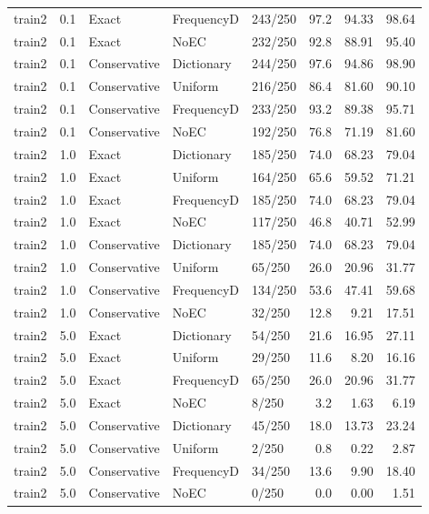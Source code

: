 \begin{longtable}{@{}lrlllrrr@{}}
train2 & 0.1 & Exact & FrequencyD & 243/250 & 97.2 & 94.33 & 98.64\\
train2 & 0.1 & Exact & NoEC & 232/250 & 92.8 & 88.91 & 95.40\\
train2 & 0.1 & Conservative & Dictionary & 244/250 & 97.6 & 94.86 & 98.90\\
train2 & 0.1 & Conservative & Uniform & 216/250 & 86.4 & 81.60 & 90.10\\
train2 & 0.1 & Conservative & FrequencyD & 233/250 & 93.2 & 89.38 & 95.71\\
train2 & 0.1 & Conservative & NoEC & 192/250 & 76.8 & 71.19 & 81.60\\
train2 & 1.0 & Exact & Dictionary & 185/250 & 74.0 & 68.23 & 79.04\\
train2 & 1.0 & Exact & Uniform & 164/250 & 65.6 & 59.52 & 71.21\\
train2 & 1.0 & Exact & FrequencyD & 185/250 & 74.0 & 68.23 & 79.04\\
train2 & 1.0 & Exact & NoEC & 117/250 & 46.8 & 40.71 & 52.99\\
train2 & 1.0 & Conservative & Dictionary & 185/250 & 74.0 & 68.23 & 79.04\\
train2 & 1.0 & Conservative & Uniform & 65/250 & 26.0 & 20.96 & 31.77\\
train2 & 1.0 & Conservative & FrequencyD & 134/250 & 53.6 & 47.41 & 59.68\\
train2 & 1.0 & Conservative & NoEC & 32/250 & 12.8 & 9.21 & 17.51\\
train2 & 5.0 & Exact & Dictionary & 54/250 & 21.6 & 16.95 & 27.11\\
train2 & 5.0 & Exact & Uniform & 29/250 & 11.6 & 8.20 & 16.16\\
train2 & 5.0 & Exact & FrequencyD & 65/250 & 26.0 & 20.96 & 31.77\\
train2 & 5.0 & Exact & NoEC & 8/250 & 3.2 & 1.63 & 6.19\\
train2 & 5.0 & Conservative & Dictionary & 45/250 & 18.0 & 13.73 & 23.24\\
train2 & 5.0 & Conservative & Uniform & 2/250 & 0.8 & 0.22 & 2.87\\
train2 & 5.0 & Conservative & FrequencyD & 34/250 & 13.6 & 9.90 & 18.40\\
train2 & 5.0 & Conservative & NoEC & 0/250 & 0.0 & 0.00 & 1.51\\
\end{longtable}
\endgroup

